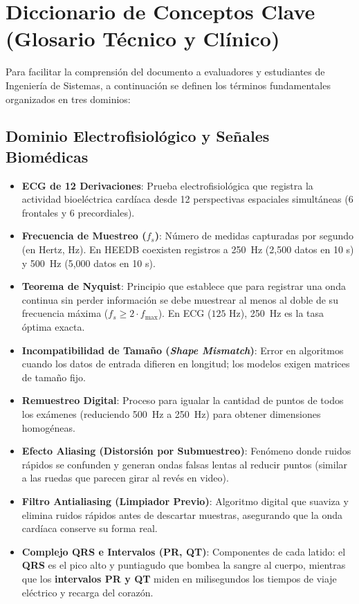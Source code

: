\documentclass[11pt,a4paper]{article}
\begin{document}
\section{Diccionario de Conceptos Clave (Glosario Técnico y Clínico)}

Para facilitar la comprensión del documento a evaluadores y estudiantes de Ingeniería de Sistemas, a continuación se definen los términos fundamentales organizados en tres dominios:

\subsection{Dominio Electrofisiológico y Señales Biomédicas}
\begin{itemize}[topsep=1pt, itemsep=1pt, parsep=0pt]
    \item \textbf{ECG de 12 Derivaciones}: Prueba electrofisiológica que registra la actividad bioeléctrica cardíaca desde 12 perspectivas espaciales simultáneas (6 frontales y 6 precordiales).
    \item \textbf{Frecuencia de Muestreo ($f_s$)}: Número de medidas capturadas por segundo (en Hertz, Hz). En HEEDB coexisten registros a 250~Hz (2,500 datos en 10 s) y 500~Hz (5,000 datos en 10 s).
    \item \textbf{Teorema de Nyquist}: Principio que establece que para registrar una onda continua sin perder información se debe muestrear al menos al doble de su frecuencia máxima ($f_s \ge 2 \cdot f_{\max}$). En ECG ($125\text{ Hz}$), 250~Hz es la tasa óptima exacta.
    \item \textbf{Incompatibilidad de Tamaño (\textit{Shape Mismatch})}: Error en algoritmos cuando los datos de entrada difieren en longitud; los modelos exigen matrices de tamaño fijo.
    \item \textbf{Remuestreo Digital}: Proceso para igualar la cantidad de puntos de todos los exámenes (reduciendo 500~Hz a 250~Hz) para obtener dimensiones homogéneas.
    \item \textbf{Efecto Aliasing (Distorsión por Submuestreo)}: Fenómeno donde ruidos rápidos se confunden y generan ondas falsas lentas al reducir puntos (similar a las ruedas que parecen girar al revés en video).
    \item \textbf{Filtro Antialiasing (Limpiador Previo)}: Algoritmo digital que suaviza y elimina ruidos rápidos antes de descartar muestras, asegurando que la onda cardíaca conserve su forma real.
    \item \textbf{Complejo QRS e Intervalos (PR, QT)}: Componentes de cada latido: el \textbf{QRS} es el pico alto y puntiagudo que bombea la sangre al cuerpo, mientras que los \textbf{intervalos PR y QT} miden en milisegundos los tiempos de viaje eléctrico y recarga del corazón.
\end{itemize}
\end{document}
